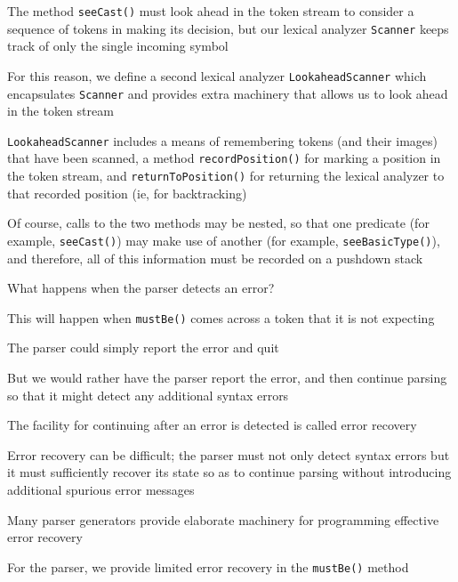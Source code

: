 \documentclass[8pt,a4paper,compress]{beamer}
\begin{document}
\begin{frame}[fragile]
\pause

The method \lstinline{seeCast()} must look ahead in the token stream to consider a sequence of tokens in making its decision, but our lexical analyzer \lstinline{Scanner} keeps track of only the single incoming symbol

\pause
\bigskip

For this reason, we define a second lexical analyzer \lstinline{LookaheadScanner} which encapsulates \lstinline{Scanner} and provides extra machinery that allows us to look ahead in the token stream

\pause
\bigskip

\lstinline{LookaheadScanner} includes a means of remembering tokens (and their images) that have been scanned, a method \lstinline{recordPosition()} for marking a position in the token stream, and \lstinline{returnToPosition()} for returning the lexical analyzer to that recorded position (ie, for backtracking)

\pause
\bigskip

Of course, calls to the two methods may be nested, so that one predicate (for example, \lstinline{seeCast()}) may make use of another (for example, \lstinline{seeBasicType()}), and therefore, all of this information must be recorded on a pushdown stack
\end{frame}

\begin{frame}[fragile]
\pause

What happens when the parser detects an error?  

\pause
\bigskip

This will happen when \lstinline{mustBe()} comes across a token that it is not expecting

\pause
\bigskip

The parser could simply report the error and quit

\pause
\bigskip

But we would rather have the parser report the error, and then continue parsing so that it might detect any additional syntax errors

\pause
\bigskip

The facility for continuing after an error is detected is called error recovery

\pause
\bigskip

Error recovery can be difficult; the parser must not only detect syntax errors but it must sufficiently recover its state so as to continue parsing without introducing additional spurious error messages

\pause
\bigskip

Many parser generators provide elaborate machinery for programming effective error recovery

\pause
\bigskip

For the \jmm parser, we provide limited error recovery in the \lstinline{mustBe()} method
\end{frame}
\end{document}

